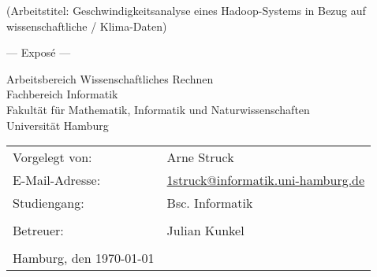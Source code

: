 \documentclass[
	12pt,
	a4paper,
	BCOR10mm,
	DIV14,
	listof=totoc,
	bibliography=totoc,
	headsepline
]{scrreprt}
\begin{document}
\begin{titlepage}
	\begin{center}
		{\titlefont\huge (Arbeitstitel: Geschwindigkeitsanalyse eines Hadoop-Systems in Bezug auf wissenschaftliche / Klima-Daten) \par}

		\bigskip
		\bigskip

		{\titlefont\Large --- Exposé ---\par}

		\bigskip
		\bigskip

		{\large Arbeitsbereich Wissenschaftliches Rechnen\\
		Fachbereich Informatik\\
		Fakultät für Mathematik, Informatik und Naturwissenschaften\\
		Universität Hamburg\par}
	\end{center}

	\vfill

	{\large \begin{tabular}{ll}
		Vorgelegt von: & Arne Struck \\
		E-Mail-Adresse: 
			& \href{mailto:1struck@informatik.uni-hamburg.de}{1struck@informatik.uni-hamburg.de} \\ 
		Studiengang: & Bsc. Informatik \\
		\\
		Betreuer: & Julian Kunkel \\
		\\
		Hamburg, den \today
	\end{tabular}\par}
\end{titlepage}

\thispagestyle{empty}

   
\tableofcontents
\end{document}
